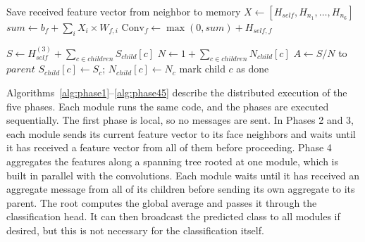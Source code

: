 \documentclass[12pt]{article}
\begin{document}
\begin{algorithm}[tb]
\caption{Phases 2/3: Message-Passed Convolution (Conv2, Conv3)}
\label{alg:phase23}
\begin{algorithmic}[1]
    \State Save received feature vector from neighbor to memory
        \State $X \gets [H_{self}, H_{n_1}, \dots, H_{n_6}]$ 
            \State $sum \gets b_f + \sum_i X_i \times W_{f,i}$
            \State $\text{Conv}_f \gets \max(0, sum) + H_{self,f}$ 
        \EndFor
        \State {} 
    \EndIf
\EndFunction
\end{algorithmic}
\end{algorithm}

\begin{algorithm}[tb]
\caption{Phases 4/5: Distributed Aggregation and Classification}
\label{alg:phase45}
\begin{algorithmic}[1]

        \State $S \gets H^{(3)}_{self} + \sum_{c \in children} S_{child}[c]$ 
        \State $N \gets 1 + \sum_{c \in children} N_{child}[c]$ 
            \State $A \gets S / N$ 
            \State {} 
        \Else
            \State {} to $parent$ 
        \EndIf
    \EndIf
\EndFunction
\Statex
{} 
    \State $S_{child}[c] \gets S_c$; \quad $N_{child}[c] \gets N_c$ 
    \State mark child $c$ as done
    \State {}
\EndFunction
\end{algorithmic}
\end{algorithm}


Algorithms~\ref{alg:phase1}--\ref{alg:phase45} describe the distributed execution of the five phases. Each module runs the same code, and the phases are executed sequentially. The first phase is local, so no messages are sent. In Phases 2 and 3, each module sends its current feature vector to its face neighbors and waits until it has received a feature vector from all of them before proceeding. Phase 4 aggregates the features along a spanning tree rooted at one module, which is built in parallel with the convolutions. Each module waits until it has received an aggregate message from all of its children before sending its own aggregate to its parent. The root computes the global average and passes it through the classification head. It can then broadcast the predicted class to all modules if desired, but this is not necessary for the classification itself.
\end{document}
